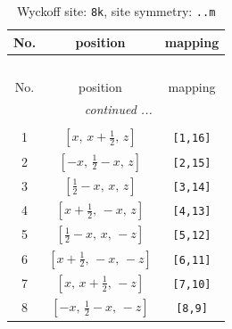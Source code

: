 \documentclass[fleqn,8pt]{jsarticle}
\begin{document}
\begin{longtable}{ccc}
\caption{Wyckoff site: {\tt 8k}, site symmetry: {\tt ..m}}
 \\
 \hline \hline
No. & position & mapping \\ \hline \endfirsthead

\multicolumn{2}{l}{\tablename\ \thetable{}} \\
 \hline \hline
No. & position & mapping \\ \hline \endhead

 \hline \hline
\multicolumn{2}{r}{\footnotesize\it continued ...} \\ \endfoot

 \hline \hline
\multicolumn{2}{r}{} \\ \endlastfoot

1 & $\left[ x,\, x + \frac{1}{2},\, z \right]$ & {\tt [1,16]} \\ \hline
2 & $\left[ - x,\, \frac{1}{2} - x,\, z \right]$ & {\tt [2,15]} \\ \hline
3 & $\left[ \frac{1}{2} - x,\, x,\, z \right]$ & {\tt [3,14]} \\ \hline
4 & $\left[ x + \frac{1}{2},\, - x,\, z \right]$ & {\tt [4,13]} \\ \hline
5 & $\left[ \frac{1}{2} - x,\, x,\, - z \right]$ & {\tt [5,12]} \\ \hline
6 & $\left[ x + \frac{1}{2},\, - x,\, - z \right]$ & {\tt [6,11]} \\ \hline
7 & $\left[ x,\, x + \frac{1}{2},\, - z \right]$ & {\tt [7,10]} \\ \hline
8 & $\left[ - x,\, \frac{1}{2} - x,\, - z \right]$ & {\tt [8,9]} \\
\end{longtable}
\renewcommand{\arraystretch}{1.2}
\end{document}
